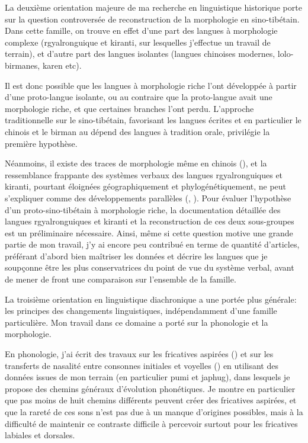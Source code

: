 \documentclass[oldfontcommands,oneside,a4paper,11pt]{article}
\begin{document}
 La deuxième orientation majeure de ma recherche en linguistique historique porte sur la question controversée de reconstruction de la morphologie en sino-tibétain. Dans cette famille, on trouve en effet d'une part des langues à morphologie complexe (rgyalronguique et kiranti, sur lesquelles j'effectue un travail de terrain), et d'autre part des langues isolantes (langues chinoises modernes, lolo-birmanes, karen etc). 
 
Il est donc possible que les langues à morphologie riche l'ont développée à partir d'une proto-langue isolante, ou au contraire que la proto-langue avait une morphologie riche, et que certaines branches l'ont perdu. L'approche traditionnelle sur le sino-tibétain, favorisant les langues écrites et en particulier le chinois et le birman au dépend des langues à tradition orale, privilégie la première hypothèse. 

Néanmoins, il existe des traces de morphologie même en chinois (\citealt{sagart99roc}), et la ressemblance frappante des systèmes verbaux des langues rgyalronguiques et kiranti, pourtant éloignées géographiquement et phylogénétiquement, ne peut s'expliquer comme des développements parallèles (\citealt{jacques10zos}, \citealt{jacques12agreement}). Pour évaluer l'hypothèse d'un proto-sino-tibétain à morphologie riche, la documentation détaillée des langues rgyalronguiques et kiranti et la reconstruction de ces deux sous-groupes est un préliminaire nécessaire. Ainsi, même si cette question motive une grande partie de mon travail, j'y ai encore peu contribué en terme de quantité d'articles, préférant d'abord bien maîtriser les données et décrire les langues que je soupçonne être les plus conservatrices du point de vue du système verbal, avant de mener de front une comparaison sur l'ensemble de la famille.
   
 La troisième orientation en linguistique diachronique a une portée plus générale: les principes des changements linguistiques, indépendamment d'une famille particulière. Mon travail dans ce domaine a porté sur la phonologie et la morphologie. 
 
 En phonologie, j'ai écrit des travaux sur les fricatives aspirées (\citealt{jacques11lingua}) et sur les transferts de nasalité entre consonnes initiales et voyelles (\citealt{michaud-jacques12nasalite}) en utilisant des données issues de mon terrain (en particulier pumi et japhug), dans lesquels je propose des chemins généraux d'évolution phonétiques. Je montre en particulier que pas moins de huit chemins différents peuvent créer des fricatives aspirées, et que la rareté de ces sons n'est pas due à un manque d'origines possibles, mais à la difficulté de maintenir ce contraste difficile à percevoir surtout pour les fricatives labiales et dorsales.  
 
\end{document}
